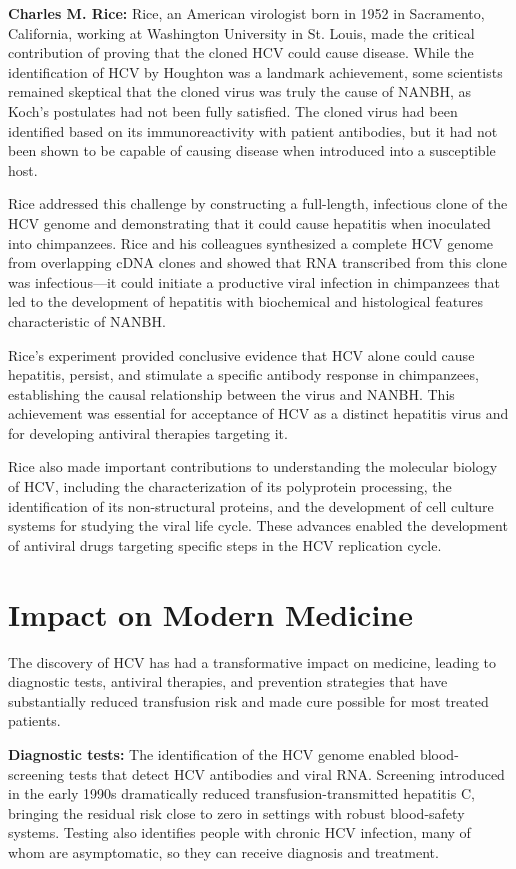 \textbf{Charles M. Rice:} Rice, an American virologist born in 1952 in Sacramento, California, working at Washington University in St. Louis, made the critical contribution of proving that the cloned HCV could cause disease. While the identification of HCV by Houghton was a landmark achievement, some scientists remained skeptical that the cloned virus was truly the cause of NANBH, as Koch's postulates had not been fully satisfied. The cloned virus had been identified based on its immunoreactivity with patient antibodies, but it had not been shown to be capable of causing disease when introduced into a susceptible host.

Rice addressed this challenge by constructing a full-length, infectious clone of the HCV genome and demonstrating that it could cause hepatitis when inoculated into chimpanzees. Rice and his colleagues synthesized a complete HCV genome from overlapping cDNA clones and showed that RNA transcribed from this clone was infectious---it could initiate a productive viral infection in chimpanzees that led to the development of hepatitis with biochemical and histological features characteristic of NANBH.

Rice's experiment provided conclusive evidence that HCV alone could cause hepatitis, persist, and stimulate a specific antibody response in chimpanzees, establishing the causal relationship between the virus and NANBH. This achievement was essential for acceptance of HCV as a distinct hepatitis virus and for developing antiviral therapies targeting it.

Rice also made important contributions to understanding the molecular biology of HCV, including the characterization of its polyprotein processing, the identification of its non-structural proteins, and the development of cell culture systems for studying the viral life cycle. These advances enabled the development of antiviral drugs targeting specific steps in the HCV replication cycle.

\section{Impact on Modern Medicine}

The discovery of HCV has had a transformative impact on medicine, leading to diagnostic tests, antiviral therapies, and prevention strategies that have substantially reduced transfusion risk and made cure possible for most treated patients.

\textbf{Diagnostic tests:} The identification of the HCV genome enabled blood-screening tests that detect HCV antibodies and viral RNA. Screening introduced in the early 1990s dramatically reduced transfusion-transmitted hepatitis C, bringing the residual risk close to zero in settings with robust blood-safety systems. Testing also identifies people with chronic HCV infection, many of whom are asymptomatic, so they can receive diagnosis and treatment.

